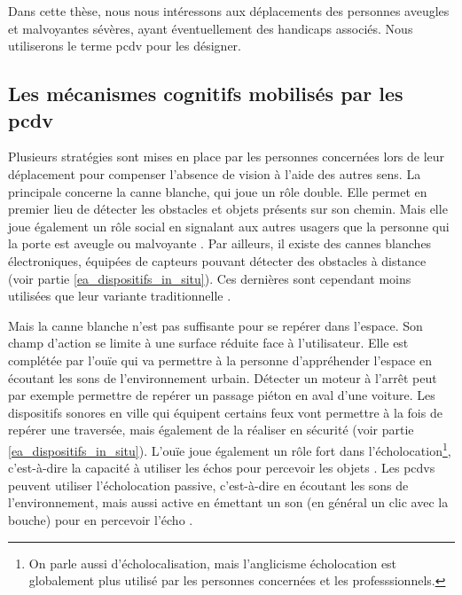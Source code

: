 \newpar{}

Dans cette thèse, nous nous intéressons aux déplacements des personnes aveugles et malvoyantes sévères, ayant éventuellement des handicaps associés. Nous utiliserons le terme \gls{pcdv} pour les désigner.

\subsection{Les mécanismes cognitifs mobilisés par les \gls{pcdv}}

%
%

Plusieurs stratégies sont mises en place par les personnes concernées lors de leur déplacement pour compenser l'absence de vision à l'aide des autres sens. La principale concerne la canne blanche, qui joue un rôle double. Elle permet en premier lieu de détecter les obstacles et objets présents sur son chemin. Mais elle joue également un rôle social en signalant aux autres usagers que la personne qui la porte est aveugle ou malvoyante \citep{ratelle_manuel_2019}. Par ailleurs, il existe des cannes blanches électroniques, équipées de capteurs pouvant détecter des obstacles à distance (voir partie \ref{ea_dispositifs_in_situ}). Ces dernières sont cependant moins utilisées que leur variante traditionnelle \citep{homere_2023}. 

\newpar{}

Mais la canne blanche n'est pas suffisante pour se repérer dans l'espace. Son champ d'action se limite à une surface réduite face à l'utilisateur. Elle est complétée par l'ouïe qui va permettre à la personne d'appréhender l'espace en écoutant les sons de l'environnement urbain. Détecter un moteur à l'arrêt peut par exemple permettre de repérer un passage piéton en aval d'une voiture. Les dispositifs sonores en ville qui équipent certains feux vont permettre à la fois de repérer une traversée, mais également de la réaliser en sécurité (voir partie \ref{ea_dispositifs_in_situ}). L'ouïe joue également un rôle fort dans l'écholocation\footnote{On parle aussi d'écholocalisation, mais l'anglicisme écholocation est globalement plus utilisé par les personnes concernées et les professsionnels.}, c’est-à-dire la capacité à utiliser les échos pour percevoir les objets \citep{Brazier2008}. Les \glspl{pcdv} peuvent utiliser l'écholocation passive, c'est-à-dire en écoutant les sons de l'environnement, mais aussi active en émettant un son (en général un clic avec la bouche) pour en percevoir l'écho \citep{thaler2016}.

